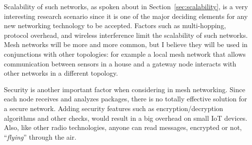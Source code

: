			Scalability of such networks, as spoken about in Section~\ref{sec:scalability}, is a very interesting research scenario since it is one of the major deciding elements for any new networking technology to be accepted.
			Factors such as multi-hopping, protocol overhead, and wireless interference limit the scalability of such networks.
			Mesh networks will be more and more common, but I believe they will be used in conjunctions with other topologies: for example a local mesh network that allows communication between sensors in a house and a gateway node interacts with other networks in a different topology.
			
			Security is another important factor when considering in mesh networking.
			Since each node receives and analyzes packages, there is no totally effective solution for a secure network.
			Adding security features such as encryption/decryption algorithms and other checks, would result in a big overhead on small IoT devices.
			Also, like other radio technologies, anyone can read messages, encrypted or not, ``\textit{flying}'' through the air.